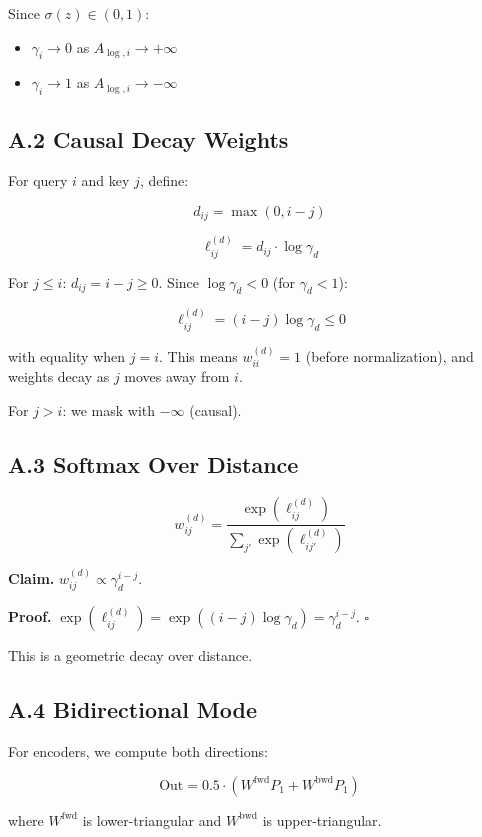 Since $\sigma(z) \in (0, 1)$:
\begin{itemize}
\item $\gamma_i \to 0$ as $A_{\log, i} \to +\infty$
\item $\gamma_i \to 1$ as $A_{\log, i} \to -\infty$

\end{itemize}
\subsection{A.2 Causal Decay Weights}

For query $i$ and key $j$, define:

\[
d_{ij} = \max(0, i - j)
\tag{A.2}
\]

\[
\ell_{ij}^{(d)} = d_{ij} \cdot \log \gamma_d
\tag{A.3}
\]

For $j \leq i$: $d_{ij} = i - j \geq 0$. Since $\log \gamma_d < 0$ 
(for $\gamma_d < 1$):

\[
\ell_{ij}^{(d)} = (i - j) \log \gamma_d \leq 0
\tag{A.4}
\]

with equality when $j = i$. This means $w_{ii}^{(d)} = 1$ (before 
normalization), and weights decay as $j$ moves away from $i$.

For $j > i$: we mask with $-\infty$ (causal).

\subsection{A.3 Softmax Over Distance}

\[
w_{ij}^{(d)} = \frac{\exp(\ell_{ij}^{(d)})}{\sum_{j'} \exp(\ell_{ij'}^{(d)})}
\tag{A.5}
\]

\textbf{Claim.} $w_{ij}^{(d)} \propto \gamma_d^{i - j}$.

\textbf{Proof.} $\exp(\ell_{ij}^{(d)}) = \exp((i-j) \log \gamma_d) = \gamma_d^{i-j}$. 
$\square$

This is a geometric decay over distance.

\subsection{A.4 Bidirectional Mode}

For encoders, we compute both directions:

\[
\text{Out} = 0.5 \cdot (W^\text{fwd} P_1 + W^\text{bwd} P_1)
\tag{A.6}
\]

where $W^\text{fwd}$ is lower-triangular and $W^\text{bwd}$ is upper-triangular.

